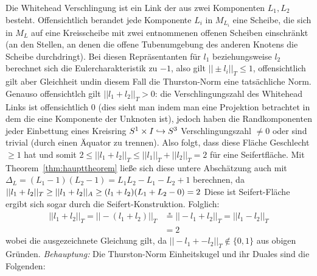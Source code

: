         Die Whitehead Verschlingung ist ein Link der aus zwei Komponenten $L_1,L_2$ besteht. Offensichtlich berandet jede Komponente $L_i$ in $M_{L_i}$ eine Scheibe, die sich in $M_L$ auf eine Kreisscheibe mit zwei entnommenen offenen Scheiben einschränkt (an den Stellen, an denen die offene Tubenumgebung des anderen Knotens die Scheibe durchdringt). Bei diesen Repräsentanten für $l_1$ beziehungsweise $l_2$ berechnet sich die Eulercharakteristik zu $-1$, also gilt $||\pm l_i||_T\leq 1$, offensichtlich gilt aber Gleichheit undin diesem Fall die Thurston-Norm eine tatsächliche Norm. Genauso offensichtlch gilt $||l_1+l_2||_T>0$: die Verschlingungszahl des Whitehead Links ist offensichtlich $0$ (dies sieht man indem man eine Projektion betrachtet in dem die eine Komponente der Unknoten ist), jedoch haben die Randkomponenten jeder Einbettung eines Kreisring $S^1\times I \hookrightarrow S^3$ Verschlingungszahl $\neq 0$ oder sind trivial (durch einen Äquator zu trennen). Also folgt, dass diese Fläche Geschlecht $\ge 1$ hat und somit $2 \leq ||l_1+l_2||_T \leq ||l_1||_T+||l_2||_T =2$ für eine Seifertfläche. Mit Theorem~\ref{thm:haupttheorem} ließe sich diese untere Abschätzung auch mit $\Delta_L = (L_1-1)(L_2-1) = L_1L_2 -L_1-L_2+1$ berechnen, da $||l_1+l_2||_T \geq ||l_1+l_2||_A \geq (l_1+l_2) (L_1+L_2-0)=2$ Diese ist Seifert-Fläche ergibt sich sogar durch die Seifert-Konstruktion. Folglich:
        \begin{align*}
            ||l_1+l_2||_T =||-(l_1+l_2)||_T &\stackrel * = ||-l_1+l_2||_T = ||l_1-l_2||_T \\
            &=2
        \end{align*}
        wobei die ausgezeichnete Gleichung gilt, da $||-l_1+-l_2||_T\not \in \{0,1\}$ aus obigen Gründen.
        \emph{Behauptung:} Die Thurston-Norm Einheitskugel und ihr Duales sind die Folgenden:\\
